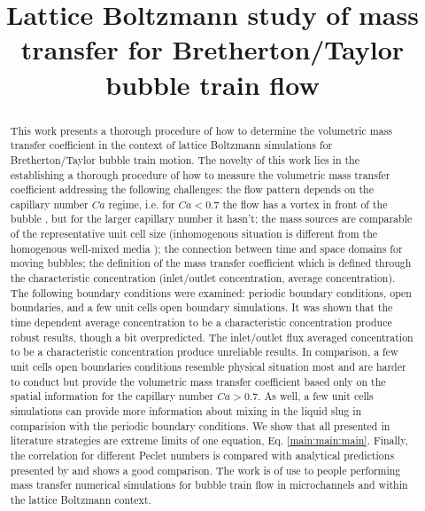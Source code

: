 \documentclass{article}
\title{Lattice Boltzmann study of mass transfer for Bretherton/Taylor bubble train flow}
\begin{document}
\maketitle
\begin{abstract}
This work presents a thorough procedure of how to determine the volumetric mass transfer
coefficient
in the context of lattice Boltzmann simulations for Bretherton/Taylor bubble train motion. The
novelty of this work lies in the establishing
a thorough procedure of how to measure the volumetric mass transfer coefficient addressing the
following challenges: the flow pattern  depends on the capillary number $Ca$ regime, i.e. for
$Ca<0.7$ the flow has a vortex in front of the
bubble \cite{giavedoni-numerical}, but for the larger capillary number it hasn't;  the mass sources are comparable of the
representative unit cell size (inhomogenous situation is different from the homogenous well-mixed
media \cite{jos-mass}); the connection between time and space domains for moving bubbles; the
definition of the mass transfer coefficient which is defined through the characteristic
concentration (inlet/outlet concentration, average concentration). The following boundary conditions
were examined: periodic boundary conditions, open boundaries, and a few unit cells open boundary
simulations. It was shown that the time dependent average concentration to be a characteristic
concentration produce robust results, though a bit overpredicted. The inlet/outlet flux averaged
concentration to be a characteristic concentration produce unreliable results. In comparison, a few
unit cells open boundaries conditions resemble physical situation most and are harder to conduct
but provide the volumetric mass transfer coefficient based only on the spatial information for the
capillary number $Ca>0.7$. As well, a few unit cells simulations can provide more information about
mixing in the liquid slug in comparision with the periodic boundary conditions. We show
that all presented in literature strategies are extreme limits of one equation,
Eq. \ref{main:main:main}. Finally, the correlation for different Peclet numbers
is compared with analytical predictions presented by \citet{vanbaten-circular} and shows a good
comparison. The work is of use to people performing mass transfer numerical simulations for bubble
train flow in microchannels and within the
lattice Boltzmann context.
\end{abstract}
\end{document}
